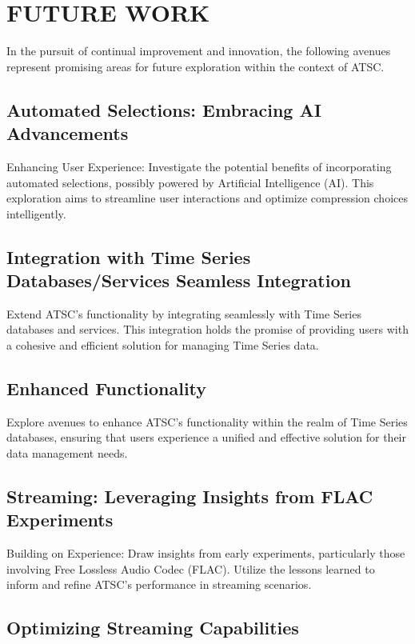 \documentclass[conference]{IEEEtran}
\begin{document}
\section{FUTURE WORK}

In the pursuit of continual improvement and innovation, the following avenues represent promising areas for future exploration within the context of ATSC.

\subsection{Automated Selections: Embracing AI Advancements}

Enhancing User Experience: Investigate the potential benefits of incorporating automated selections, possibly powered by Artificial Intelligence (AI). This exploration aims to streamline user interactions and optimize compression choices intelligently.

\subsection*{Integration with Time Series Databases/Services Seamless Integration}

Extend ATSC's functionality by integrating seamlessly with Time Series databases and services. This integration holds the promise of providing users with a cohesive and efficient solution for managing Time Series data.

\subsection{Enhanced Functionality}

Explore avenues to enhance ATSC's functionality within the realm of Time Series databases, ensuring that users experience a unified and effective solution for their data management needs.

\subsection{Streaming: Leveraging Insights from FLAC Experiments}

Building on Experience: Draw insights from early experiments, particularly those involving Free Lossless Audio Codec (FLAC). Utilize the lessons learned to inform and refine ATSC's performance in streaming scenarios.

\subsection{Optimizing Streaming Capabilities}
\end{document}
